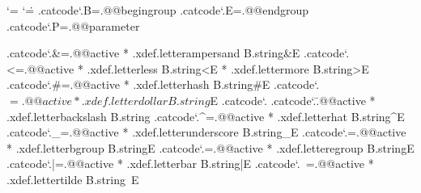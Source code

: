 \iffalse %

\edef\@@XML            {*}
\edef\@@XMLentity      {\@@XML a} %
\edef\@@XMLelement     {\@@XML b} %
\edef\@@XMLvariable    {\@@XML c} %
\edef\@@XMLvalue       {\@@XML d} %
\edef\@@XMLpars        {\@@XML e} %
\edef\@@XMLdata        {\@@XML f} %
\edef\@@XMLcode        {\@@XML g} %
\edef\@@XMLinstruction {\@@XML h} %
\edef\@@XMLmap         {\@@XML i} %
\edef\@@XMLlist        {\@@XML j} %
\edef\@@XMLnamespace   {\@@XML k} %
\edef\@@XMLurlspace    {\@@XML l} %
\edef\@@XMLescape      {\@@XML m} %
\edef\@@XMLdepth       {\@@XML n} %
\edef\@@XMLdopth       {\@@XML o} %
\edef\@@XMLsave        {\@@XML p} %

\fi

\newtoks\XMLtoks
\newtoks\XMLresetlist

\newif\ifignoreXMLspaces
\newif\iffixedXMLfont
\newif\iftraceXMLelements

\newcount\XMLlevel %
\newcount\XMLdepth %

\newtoks\everyenableXML



\chardef\XMLtokensreduction\zerocount



\bgroup
\catcode`\*=\@@comment
\catcode`\.=\@@escape
.catcode`.B=.@@begingroup
.catcode`.E=.@@endgroup
.catcode`.P=.@@parameter

.catcode`.&=.@@active * .xdef.letterampersand  B.string&E
.catcode`.<=.@@active * .xdef.letterless       B.string<E
                      * .xdef.lettermore       B.string>E
.catcode`.#=.@@active * .xdef.letterhash       B.string#E
.catcode`.$=.@@active * .xdef.letterdollar     B.string$E
.catcode`.%
.catcode`.\=.@@active * .xdef.letterbackslash  B.string\E
.catcode`.^=.@@active * .xdef.letterhat        B.string^E
.catcode`._=.@@active * .xdef.letterunderscore B.string_E
.catcode`.{=.@@active * .xdef.letterbgroup     B.string{E
.catcode`.}=.@@active * .xdef.letteregroup     B.string}E
.catcode`.|=.@@active * .xdef.letterbar        B.string|E
.catcode`.~=.@@active * .xdef.lettertilde      B.string~E

